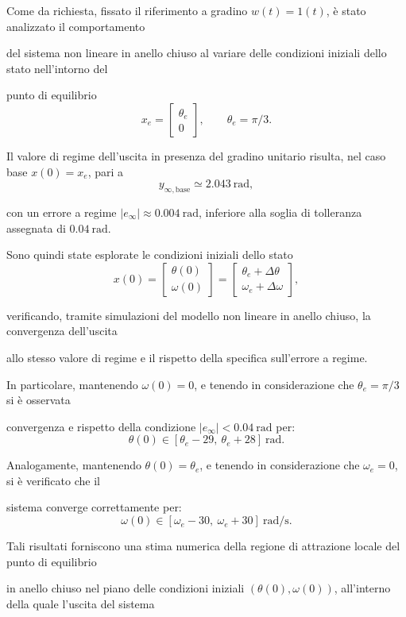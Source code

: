 \documentclass[a4paper, 11pt]{article}
\begin{document}
Come da richiesta, fissato il riferimento a gradino
$w(t)=1(t)$, è stato analizzato il comportamento 

del sistema non lineare in anello chiuso al variare delle condizioni iniziali dello stato nell’intorno del 

punto di equilibrio
\[
x_e=\begin{bmatrix}\theta_e\\0\end{bmatrix}, \qquad \theta_e=\pi/3.
\]

Il valore di regime dell’uscita in presenza del gradino unitario risulta, nel caso base \(x(0)=x_e\), pari a
\[
y_{\infty,\text{base}} \simeq 2.043\ \text{rad},
\]

con un errore a regime \(|e_\infty|\approx 0.004\ \text{rad}\), inferiore alla soglia di tolleranza assegnata di \(0.04\ \text{rad}\).

Sono quindi state esplorate le condizioni iniziali dello stato
\[
x(0)=
\begin{bmatrix}
\theta(0)\\
\omega(0)
\end{bmatrix}
=
\begin{bmatrix}
\theta_e+\Delta\theta\\
\omega_e +\Delta\omega
\end{bmatrix},
\]

verificando, tramite simulazioni del modello non lineare in anello chiuso, la convergenza dell’uscita 

allo stesso valore di regime e il rispetto della specifica sull’errore a regime.

In particolare, mantenendo \(\omega(0)=0\), e tenendo in considerazione che $\theta_e = \pi/3$ si è osservata 

convergenza e rispetto della condizione \(|e_\infty|<0.04\ \text{rad}\) per:
\[
\theta(0)\in[\theta_e-29,\ \theta_e+28]\ \text{rad}.
\]


Analogamente, mantenendo \(\theta(0)=\theta_e\), e tenendo in considerazione che $\omega_e = 0$, si è verificato che il 

sistema converge correttamente per:
\[
\omega(0)\in[\omega_e-30,\ \omega_e+ 30]\ \text{rad/s}.
\]

Tali risultati forniscono una stima numerica della regione di attrazione locale del punto di equilibrio 

in anello chiuso nel piano delle condizioni iniziali \((\theta(0),\omega(0))\), all’interno della quale l’uscita del sistema 
\end{document}
